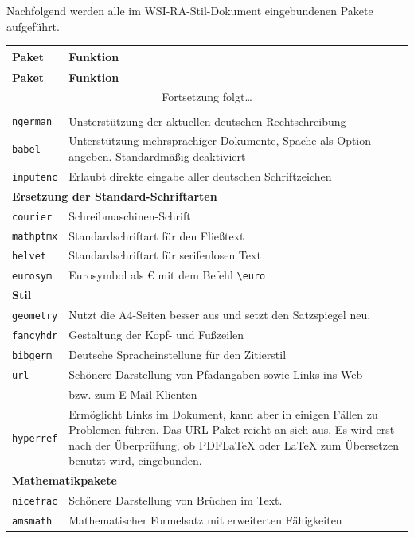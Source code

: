 Nachfolgend werden alle im WSI-RA-Stil-Dokument eingebundenen Pakete aufgeführt.
\begin{longtable}{p{}p{}}
\toprule
\textbf{Paket} & \textbf{Funktion}\\
\midrule
\endfirsthead
\toprule
\textbf{Paket} & \textbf{Funktion}\\
\midrule
\endhead
\multicolumn{2}{c}{Fortsetzung folgt\dots}\\
\endfoot
\endlastfoot
\multicolumn{2}{l}{\bf Grundlegendes für die Sprache}\\
\texttt{ngerman}		& Unsterstützung der aktuellen deutschen Rechtschreibung\\
\texttt{babel}		& Unterstützung mehrsprachiger Dokumente, Spache als Option
angeben. Standardmäßig deaktiviert\\
\texttt{inputenc}	& Erlaubt direkte eingabe aller deutschen Schriftzeichen\\
\multicolumn{2}{l}{\bf Ersetzung der Standard-Schriftarten}\\
\texttt{courier}		& Schreibmaschinen-Schrift\\
\texttt{mathptmx}		& Standardschriftart für den Fließtext\\
\texttt{helvet}	& Standardschriftart für serifenlosen Text\\
\texttt{eurosym}	& Eurosymbol als \euro{} mit dem Befehl \verb!\euro!\\
\multicolumn{2}{l}{\bf Stil}\\
\texttt{geometry}		& Nutzt die A4-Seiten besser aus und setzt den Satzspiegel
neu.\\
\texttt{fancyhdr}		& Gestaltung der Kopf- und Fußzeilen\\
\texttt{bibgerm}	& Deutsche Spracheinstellung für den Zitierstil\\
\texttt{url}		& Schönere Darstellung von Pfadangaben sowie Links ins Web\\
				& bzw. zum E-Mail-Klienten\\
\texttt{hyperref}		& Ermöglicht Links im Dokument, kann aber in einigen Fällen
zu Problemen führen. Das URL-Paket reicht an sich aus. Es wird erst nach der
Überprüfung, ob PDF\LaTeX{} oder \LaTeX{} zum Übersetzen benutzt wird,
eingebunden.\\
\multicolumn{2}{l}{\bf Mathematikpakete}\\
\texttt{nicefrac}		& Schönere Darstellung von Brüchen im Text.\\
\texttt{amsmath}		& Mathematischer Formelsatz mit erweiterten Fähigkeiten\\

\end{longtable}
